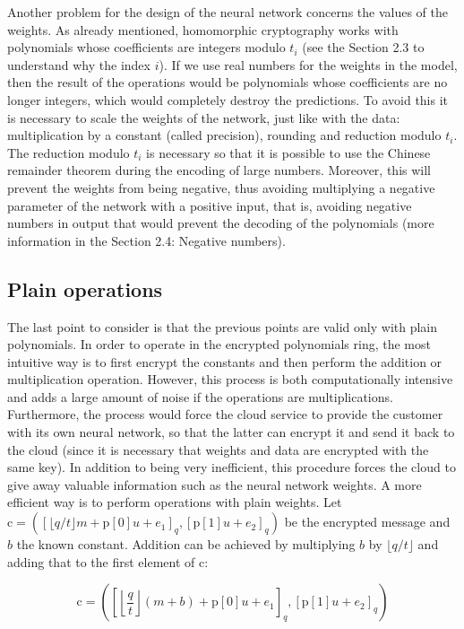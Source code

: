 Another problem for the design of the neural network concerns the values of the weights. As already mentioned, homomorphic cryptography works with polynomials whose coefficients are integers modulo $t_i$ (see the Section 2.3 to understand why the index $i$). If we use real numbers for the weights in the model, then the result of the operations would be polynomials whose coefficients are no longer integers, which would completely destroy the predictions. To avoid this it is necessary to scale the weights of the network, just like with the data: multiplication by a constant (called precision), rounding and reduction modulo $t_i$. The reduction modulo $t_i$ is necessary so that it is possible to use the Chinese remainder theorem during the encoding of large numbers. Moreover, this will prevent the weights from being negative, thus avoiding multiplying a negative parameter of the network with a positive input, that is, avoiding negative numbers in output that would prevent the decoding of the polynomials (more information in the Section 2.4: Negative numbers).

\subsection{Plain operations}

The last point to consider is that the previous points are valid only with plain polynomials. In order to operate in the encrypted polynomials ring, the most intuitive way is to first encrypt the constants and then perform the addition or multiplication operation. However, this process is both computationally intensive and adds a large amount of noise if the operations are multiplications. Furthermore, the process would force the cloud service to provide the customer with its own neural network, so that the latter can encrypt it and send it back to the cloud (since it is necessary that weights and data are encrypted with the same key). In addition to being very inefficient, this procedure forces the cloud to give away valuable information such as the neural network weights. A more efficient way is to perform operations with plain weights. Let $\text{c}=([\lfloor q/t\rfloor m+\text{p}[0]u+e_1]_q,[\text{p}[1]u+e_2]_q)$ be the encrypted message and $b$ the known constant. Addition can be achieved by multiplying $b$ by $\lfloor q/t\rfloor$ and adding that to the first element of c:

\begin{equation*}
    \text{c} = \left(\left[\left \lfloor \frac{q}{t} \right \rfloor (m+b) + \text{p}[0] u + e_1 \right]_q , [\text{p}[1] u + e_2 ]_q\right) 
\end{equation*}

